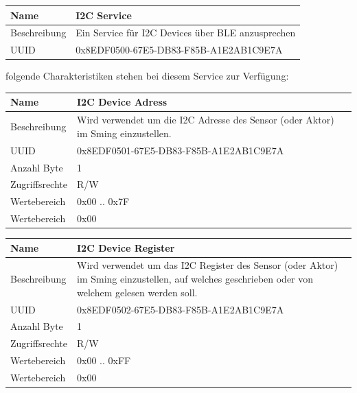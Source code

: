 \begin{tabularx}{\textwidth}{|l|X|}
\hline
Name & I2C Service                                       \\
\hline
Beschreibung & Ein Service für I2C Devices über BLE anzusprechen \\
\hline
UUID	&    0x8EDF0500-67E5-DB83-F85B-A1E2AB1C9E7A  \\
\hline                                            
\end{tabularx}

folgende Charakteristiken stehen bei diesem Service zur Verfügung:

\begin{tabularx}{\textwidth}{|l|X|}
\hline
Name & I2C Device Adress                                   \\
\hline
Beschreibung & Wird verwendet um die I2C Adresse des Sensor (oder Aktor) im Sming einzustellen. \\
\hline
UUID	&    0x8EDF0501-67E5-DB83-F85B-A1E2AB1C9E7A  \\
\hline     
Anzahl Byte	&    1  \\
\hline      
Zugriffsrechte	&   R/W  \\
\hline        
Wertebereich	&   0x00 .. 0x7F \\
\hline          
Wertebereich	&   0x00 \\
\hline                                     
\end{tabularx}

\begin{tabularx}{\textwidth}{|l|X|}
\hline
Name & I2C Device Register                                  \\
\hline
Beschreibung & Wird verwendet um das I2C Register des Sensor (oder Aktor) im Sming einzustellen, auf welches geschrieben oder von welchem gelesen werden soll. \\
\hline
UUID	&    0x8EDF0502-67E5-DB83-F85B-A1E2AB1C9E7A  \\
\hline     
Anzahl Byte	&    1  \\
\hline      
Zugriffsrechte	&   R/W  \\
\hline        
Wertebereich	&   0x00 .. 0xFF \\
\hline          
Wertebereich	&   0x00 \\
\hline                                     
\end{tabularx}

